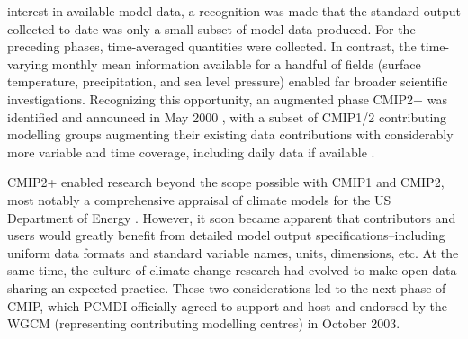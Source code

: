 \documentclass[gmd, preprint]{copernicus}
\newcommand{\mycomment}[1]{}
\begin{document}
interest in available model data, a recognition was made that the standard output collected to date was only a small subset of model data produced. For the preceding phases, time-averaged quantities were collected. In contrast, the time-varying monthly mean information available for a handful of fields (surface temperature, precipitation, and sea level pressure) enabled far broader scientific investigations. Recognizing this opportunity, an augmented phase CMIP2+ was identified and announced in May 2000 \citep{villwock_6th_2003, meehl_cmip_2003, meehl_overview_2005}, with a subset of CMIP1/2 contributing modelling groups augmenting their existing data contributions with considerably more variable and time coverage, including daily data if available \citep{achutarao_pcmdi_2004}.

CMIP2+ enabled research beyond the scope possible with CMIP1 and CMIP2, most notably a comprehensive appraisal of climate models for the US Department of Energy \citep{achutarao_pcmdi_2004}. However, it soon became apparent that contributors and users would greatly benefit from detailed model output specifications--including uniform data formats and standard variable names, units, dimensions, etc. At the same time, the culture of climate-change research had evolved to make open data sharing an expected practice. These two considerations led to the next phase of CMIP, which PCMDI officially agreed to support and host and endorsed by the WGCM (representing contributing modelling centres) in October 2003.

\mycomment{
Curt C to provide a sentence or two about the dramatic growth of the registered subprojects that had been the standard engagement way in AMIP1/2, CMIP1/2 and how that
led to the opening up of the CMIP3 archive to open-access 85 FTP, and no registered subprojects? - If I have that right?

WGOMD establishment after WGCM-2 in Melbourne Oct 1998 - see https://eprints.soton.ac.uk/30149/1/040_wgcm4.pdf#Page=9 /sect3.5 also JSC-21 also see https://www.wcrp-climate.org/modelling-wgcm-publications
CMIP1/2/2+ announcement emails for timing - https://web.archive.org/web/20040827091054/http://www-pcmdi.llnl.gov/cmip/
Also PMIP 1991 - prescribed SSTs AGCMs \citep{braconnot_paleoclimate_2011} \textbf{(Karl to help here)}
Also AMIP2 proceedings, Gleckler et al 2005 - https://pcmdi.llnl.gov/mips/amip/amip2_workshop_proceedings.pdf#page=11 - https://www.osti.gov/biblio/15014509
And Potter 1999 - new strategy beyond AMIP - https://www.osti.gov/biblio/791127
Also Meehl 2019 https://www.wcrp-climate.org/images/AGU2019/presentations/Symposium/11-Meehl_WCRP40.pdf
}
\end{document}
